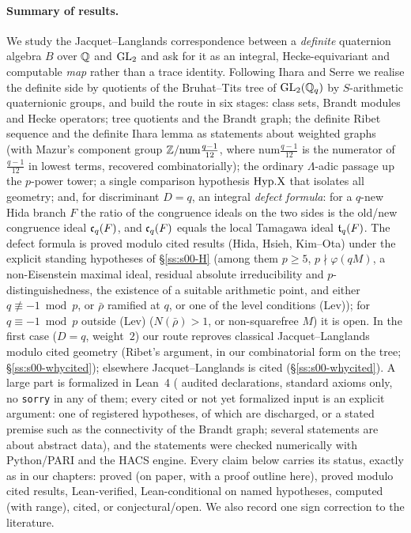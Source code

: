 \paragraph{Summary of results.}
We study the Jacquet--Langlands correspondence between a \emph{definite} quaternion algebra $B$ over $\mathbb{Q}$ and $\mathrm{GL}_2$ and ask
for it as an integral, Hecke-equivariant and computable \emph{map} rather than a trace identity. Following Ihara and Serre we
realise the definite side by quotients of the Bruhat--Tits tree of $\mathrm{GL}_2(\mathbb{Q}_q)$ by $S$-arithmetic quaternionic groups, and build
the route in six stages: class sets, Brandt modules and Hecke operators; tree quotients and the Brandt graph; the definite
Ribet sequence and the definite Ihara lemma as statements about weighted graphs (with Mazur's component group
$\mathbb{Z}/\mathrm{num}\frac{q-1}{12}$, where $\mathrm{num}\frac{q-1}{12}$ is the numerator of $\frac{q-1}{12}$ in lowest terms, recovered combinatorially); the ordinary $\Lambda$-adic passage up the $p$-power tower; a single
comparison hypothesis $\mathrm{Hyp.X}$ that isolates all geometry; and, for discriminant $D=q$, an integral \emph{defect formula}: for a
$q$-new Hida branch $F$ the ratio of the congruence ideals on the two sides is the old/new congruence ideal $\mathfrak{c}_q(F)$, and
$\mathfrak{c}_q(F)$ equals the local Tamagawa ideal $\mathfrak{t}_q(F)$. The defect formula is proved modulo cited results (Hida, Hsieh, Kim--Ota)
under the explicit standing hypotheses of \S\ref{ss:s00-H} (among them $p\ge5$, $p\nmid\varphi(qM)$, a non-Eisenstein maximal
ideal, residual absolute irreducibility and $p$-distinguishedness, the existence of a suitable arithmetic point, and either
$q\not\equiv-1\bmod p$, or $\bar\rho$ ramified at $q$, or one of the level conditions (Lev)); for $q\equiv-1\bmod p$ outside (Lev)
($N(\bar\rho)>1$, or non-squarefree $M$) it is open. In the first case ($D=q$, weight~$2$) our route reproves classical Jacquet--Langlands modulo cited geometry
(Ribet's argument, in our combinatorial form on the tree; \S\ref{ss:s00-whycited}); elsewhere Jacquet--Langlands is cited (\S\ref{ss:s00-whycited}). A large part is formalized in Lean~4 (\GateAudited{} audited
declarations, standard axioms only, no \texttt{sorry} in any of them; every cited or not yet formalized input is an explicit argument: one of \NumHypRegistered{} registered hypotheses, of which
\NumHypDischarged{} are discharged, or a stated premise such as the connectivity of the Brandt graph; several statements are about
abstract data), and the
statements were checked numerically with Python/PARI and the HACS engine. Every claim below carries its status, exactly as in
our chapters: proved (on paper, with a proof outline here), proved modulo cited results, Lean-verified, Lean-conditional on named
hypotheses, computed (with range), cited, or conjectural/open. We also record one sign correction to the literature.
